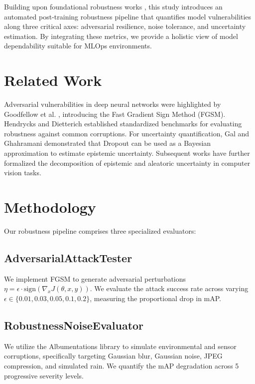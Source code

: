 \documentclass[conference]{IEEEtran}
\begin{document}
Building upon foundational robustness works \cite{madry2018towards, carlini2017towards}, this study introduces an automated post-training robustness pipeline that quantifies model vulnerabilities along three critical axes: adversarial resilience, noise tolerance, and uncertainty estimation. By integrating these metrics, we provide a holistic view of model dependability suitable for MLOps environments.

\section{Related Work}
Adversarial vulnerabilities in deep neural networks were highlighted by Goodfellow et al. \cite{goodfellow2015fgsm}, introducing the Fast Gradient Sign Method (FGSM). Hendrycks and Dietterich \cite{hendrycks2019benchmarking} established standardized benchmarks for evaluating robustness against common corruptions. For uncertainty quantification, Gal and Ghahramani \cite{gal2016dropout} demonstrated that Dropout can be used as a Bayesian approximation to estimate epistemic uncertainty. Subsequent works \cite{kendall2017uncertainties, lakshminarayanan2017simple} have further formalized the decomposition of epistemic and aleatoric uncertainty in computer vision tasks.

\section{Methodology}
Our robustness pipeline comprises three specialized evaluators:

\subsection{AdversarialAttackTester}
We implement FGSM to generate adversarial perturbations $\eta = \epsilon \cdot \text{sign}(\nabla_x J(\theta, x, y))$. We evaluate the attack success rate across varying $\epsilon \in \{0.01, 0.03, 0.05, 0.1, 0.2\}$, measuring the proportional drop in mAP.

\subsection{RobustnessNoiseEvaluator}
We utilize the Albumentations library to simulate environmental and sensor corruptions, specifically targeting Gaussian blur, Gaussian noise, JPEG compression, and simulated rain. We quantify the mAP degradation across 5 progressive severity levels.
\end{document}
